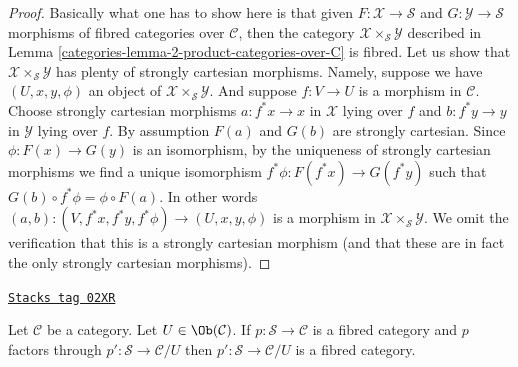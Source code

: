 \begin{proof}

Basically what one has to show here is that given
$F : \mathcal{X} \to \mathcal{S}$ and
$G : \mathcal{Y} \to \mathcal{S}$ morphisms of fibred
categories over $\mathcal{C}$, then the category
$\mathcal{X} \times_\mathcal{S} \mathcal{Y}$
described in Lemma \ref{categories-lemma-2-product-categories-over-C} is fibred.
Let us show that $\mathcal{X} \times_\mathcal{S} \mathcal{Y}$
has plenty of strongly cartesian morphisms.
Namely, suppose we have $(U, x, y, \phi)$ an object of
$\mathcal{X} \times_\mathcal{S} \mathcal{Y}$.
And suppose $f : V \to U$ is a morphism in $\mathcal{C}$.
Choose strongly cartesian morphisms $a : f^*x \to x$ in $\mathcal{X}$
lying over $f$ and $b : f^*y \to y$ in $\mathcal{Y}$ lying over $f$.
By assumption $F(a)$ and $G(b)$ are strongly cartesian.
Since $\phi : F(x) \to G(y)$ is an isomorphism, by the uniqueness
of strongly cartesian morphisms we find a unique isomorphism
$f^*\phi : F(f^*x) \to G(f^*y)$ such that
$G(b) \circ f^*\phi = \phi \circ F(a)$. In other words
$(a, b) : (V, f^*x, f^*y, f^*\phi) \to (U, x, y, \phi)$
is a morphism in $\mathcal{X} \times_\mathcal{S} \mathcal{Y}$.
We omit the verification that this is a strongly cartesian morphism
(and that these are in fact the only strongly cartesian morphisms).
\end{proof}

\begin{lemma}[Cute]
\label{categories-lemma-cute}
\href{https://stacks.math.columbia.edu/tag/02XR}{\texttt{Stacks tag 02XR}}

Let $\mathcal{C}$ be a category. Let $U \in \Ob(\mathcal{C})$.
If $p : \mathcal{S} \to \mathcal{C}$ is a fibred category
and $p$ factors through $p' : \mathcal{S} \to \mathcal{C}/U$
then $p' : \mathcal{S} \to \mathcal{C}/U$ is a fibred category.
\end{lemma}

